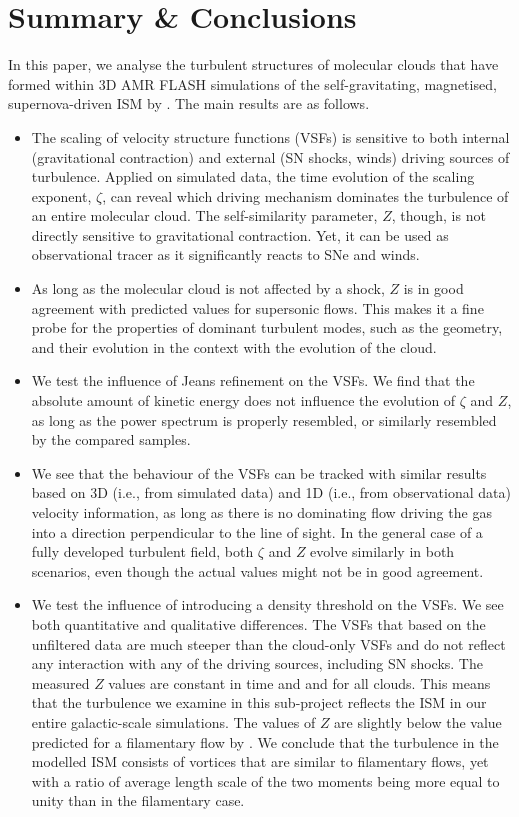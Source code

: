 \section{Summary \& Conclusions}\label{conclusions}

In this paper, we analyse the turbulent structures of molecular clouds that have formed within 3D AMR FLASH simulations of the self-gravitating, magnetised, supernova-driven ISM by \citet{IbanezMejia2016}.
The main results are as follows.

\begin{itemize}
	\item The scaling of velocity structure functions (VSFs) is sensitive to both internal (gravitational contraction) and external (SN shocks, winds) driving sources of turbulence. Applied on simulated data, the time evolution of the scaling exponent, $\zeta$, can reveal which driving mechanism dominates the turbulence of an entire molecular cloud. The self-similarity parameter, $Z$, though, is not directly sensitive to gravitational contraction. Yet, it can be used as observational tracer as it significantly reacts to SNe and winds.
	\item As long as the molecular cloud is not affected by a shock, $Z$ is in good agreement with predicted values for supersonic flows. This makes it a fine probe for the properties of dominant turbulent modes, such as the geometry, and their evolution in the context with the evolution of the cloud. 
	\item We test the influence of Jeans refinement on the VSFs. We find that the absolute amount of kinetic energy does not influence the evolution of $\zeta$ and $Z$, as long as the power spectrum is properly resembled, or similarly resembled by the compared samples.
	\item We see that the behaviour of the VSFs can be tracked with similar results based on 3D (i.e., from simulated data) and 1D (i.e., from observational data) velocity information, as long as there is no dominating flow driving the gas into a direction perpendicular to the line of sight. In the general case of a fully developed turbulent field, both $\zeta$ and $Z$ evolve similarly in both scenarios, even though the actual values might not be in good agreement.
	\item We test the influence of introducing a density threshold on the VSFs. We see both quantitative and qualitative differences. The VSFs that based on the unfiltered data are much steeper than the cloud-only VSFs and do not reflect any interaction with any of the driving sources, including SN shocks. The measured $Z$ values are constant in time and and for all clouds. This means that the turbulence we examine in this sub-project reflects the ISM in our entire galactic-scale simulations. The values of $Z$ are slightly below the value predicted for a filamentary flow by \citet{She1994}. We conclude that the turbulence in the modelled ISM consists of vortices that are similar to filamentary flows, yet with a ratio of average length scale of the two moments being more equal to unity than in the filamentary case.

\end{itemize}
